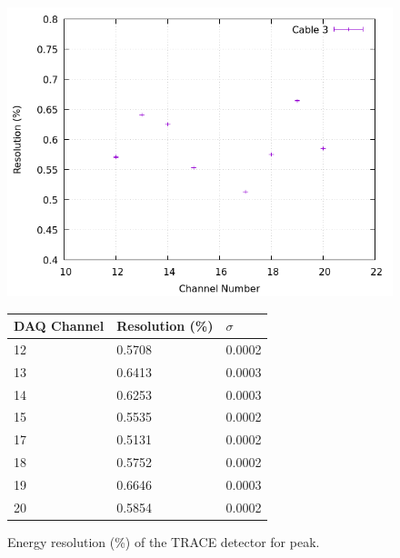 \begin{figure}[h]
  \centering
  \begin{minipage}[b]{0.45\textwidth}
  \vspace{5mm}
    \includegraphics[width=\textwidth]{img/plot/am/3_res_am.png}
    \label{res:am3}
  \end{minipage}
  \hfill
  \begin{minipage}[b]{0.45\textwidth}
    \begin{tabular}{lll}
      DAQ Channel & Resolution (\%) & $\sigma$ \\
      \midrule
      12 & \num{0.5708} & 0.0002 \\
      13 & \num{0.6413} & 0.0003 \\
      14 & \num{0.6253} & 0.0003 \\
      15 & \num{0.5535} & 0.0002 \\
      17 & \num{0.5131} & 0.0002 \\
      18 & \num{0.5752} & 0.0002 \\
      19 & \num{0.6646} & 0.0003 \\
      20 & \num{0.5854} & 0.0002 \\
      \bottomrule
    \end{tabular}
    \label{res:plot:am3}
  \end{minipage}
  \caption{Energy resolution (\%) of the TRACE detector for  peak.}
  \label{res:am}
\end{figure}

